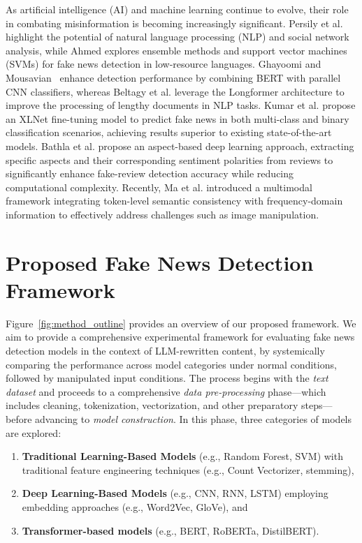 \documentclass[runningheads]{llncs}
\begin{document}
As artificial intelligence (AI) and machine learning continue to evolve, their role in combating misinformation is becoming increasingly significant. Persily et al.\cite{persily2021democracy} highlight the potential of natural language processing (NLP) and social network analysis, while Ahmed\cite{ahmed2023kurdishfakenews} explores ensemble methods and support vector machines (SVMs) for fake news detection in low-resource languages. Ghayoomi and Mousavian~\cite{ghayoomi2022covidfake} enhance detection performance by combining BERT with parallel CNN classifiers, whereas Beltagy et al.\cite{beltagy2020longformer} leverage the Longformer architecture to improve the processing of lengthy documents in NLP tasks. Kumar et al.\cite{kumar2021fake} propose an XLNet fine-tuning model to predict fake news in both multi-class and binary classification scenarios, achieving results superior to existing state-of-the-art models. Bathla et al.\cite{bathla2022intelligent} propose an aspect-based deep learning approach, extracting specific aspects and their corresponding sentiment polarities from reviews to significantly enhance fake-review detection accuracy while reducing computational complexity. Recently, Ma et al.\cite{ma2024learning} introduced a multimodal framework integrating token-level semantic consistency with frequency-domain information to effectively address challenges such as image manipulation.


\section{Proposed Fake News Detection Framework}

Figure~\ref{fig:method_outline} provides an overview of our proposed framework. We aim to provide a comprehensive experimental framework for evaluating fake news detection models in the context of LLM-rewritten content, by systemically comparing the performance across model categories under normal conditions, followed by manipulated input conditions. The process begins with the \emph{text dataset} and proceeds to a comprehensive \emph{data pre-processing} phase—which includes cleaning, tokenization, vectorization, and other preparatory steps—before advancing to \emph{model construction}. In this phase, three categories of models are explored:
\begin{enumerate}
    \item \textbf{Traditional Learning-Based Models} (e.g., Random Forest, SVM) with traditional feature engineering techniques (e.g., Count Vectorizer, stemming),
    \item \textbf{Deep Learning-Based Models} (e.g., CNN, RNN, LSTM) employing embedding approaches (e.g., Word2Vec, GloVe), and
    \item \textbf{Transformer-based models} (e.g., BERT, RoBERTa, DistilBERT).
\end{enumerate}
\end{document}
